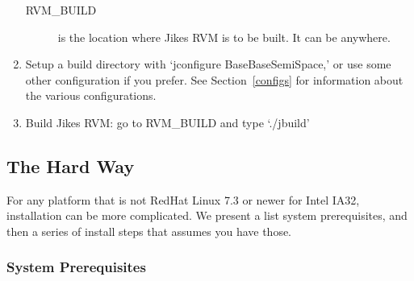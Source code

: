 \begin{enumerate}
\begin{description}
\item[RVM\_BUILD] is the location where Jikes RVM is to be built.  It
can be anywhere.
\end{description}

\item Setup a build directory with `jconfigure BaseBaseSemiSpace,' or
use some other configuration if you prefer. See Section~\ref{configs}
for information about the various configurations.

\item Build Jikes RVM: go to RVM\_BUILD and type `./jbuild'

\end{enumerate}

\newcommand{\gccURL}{ftp://ftp.gnu.org/gnu/gcc}
\newcommand{\glibcURL}{ftp://ftp.gnu.org/gnu/glibc}
\newcommand{\makeURL}{ftp://ftp.gnu.org/gnu/make}
\newcommand{\tarURL}{ftp://ftp.gnu.org/gnu/tar}
\newcommand{\autoconfURL}{ftp://ftp.gnu.org/gnu/autoconf}
\newcommand{\automakeURL}{ftp://ftp.gnu.org/gnu/automake}
\newcommand{\kshURL}{http://www.cs.mun.ca/~michael/pdksh}
\newcommand{\linuxPPCJDKURL}{http://www.ibm.com/java/jdk/linux/index.html}
\newcommand{\linuxKernelURL}{http://www.kernel.org}

\subsection{The Hard Way}

 For any platform that is not RedHat Linux 7.3 or newer for Intel
IA32, installation can be more complicated.  We present a list system
prerequisites, and then a series of install steps that assumes you
have those.

\subsubsection{System Prerequisites}

